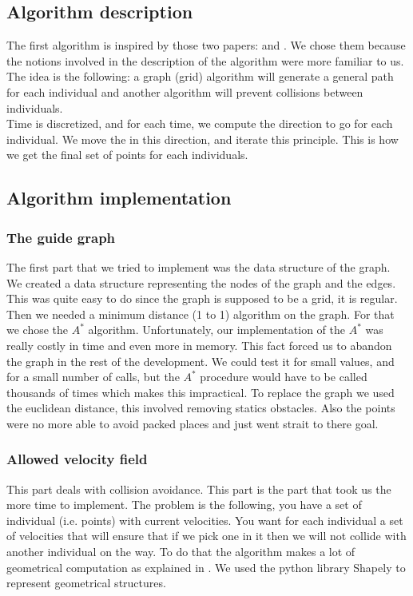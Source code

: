 \subsection{Algorithm description}

The first algorithm is inspired by those two papers: \cite{PLE} and \cite{vandenBerg2011}. We chose them because the notions involved in the description of the algorithm were more familiar to us.
The idea is the following: a graph (grid) algorithm will generate a general path for each individual and another algorithm will prevent collisions between individuals. \\
Time is discretized, and for each time, we compute the direction to go for each individual. We move the in this direction, and iterate this principle. This is how we get the final set of points for each individuals.


\subsection{Algorithm implementation}

\subsubsection{The guide graph}

The first part that we tried to implement was the data structure of the graph. We created a data structure representing the nodes of the graph and the edges. This was quite easy to do since the graph is supposed to be a grid, it is regular.
Then we needed a minimum distance (1 to 1) algorithm on the graph. For that we chose the $A^*$ algorithm. Unfortunately, our implementation of the $A^*$ was really costly in time and even more in memory. This fact forced us to abandon the graph in the rest of the development. We could test it for small values, and for a small number of calls, but the $A^*$ procedure would have to be called thousands of times which makes this impractical. 
To replace the graph we used the euclidean distance, this involved removing statics obstacles. Also the points were no more able to avoid packed places and just went strait to there goal.

\subsubsection{Allowed velocity field}

This part deals with collision avoidance. This part is the part that took us the more time to implement. The problem is the following, you have a set of individual (i.e. points) with current velocities. You want for each individual a set of velocities that will ensure that  if we pick one in it then we will not collide with another individual on the way. To do that the algorithm makes a lot of geometrical computation as explained in \cite{vandenBerg2011}. We used the python library Shapely to represent geometrical structures. 

